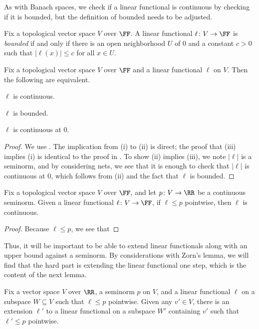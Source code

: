 \documentclass[notes.tex]{subfiles}
\begin{document}
As with Banach spaces, we check if a linear functional is continuous by checking if it is bounded, but the definition of bounded needs to be adjusted.
\begin{definition}[bounded]
	Fix a topological vector space $V$ over $\FF$. A linear functional $\ell\colon V\to\FF$ is \textit{bounded} if and only if there is an open neighborhood $U$ of $0$ and a constant $c>0$ such that $\left|\ell(x)\right|\le c$ for all $x\in U$.
\end{definition}
\begin{lemma}
	Fix a topological vector space $V$ over $\FF$ and a linear functional $\ell$ on $V$. Then the following are equivalent.
	\begin{listroman}
		\item $\ell$ is continuous.
		\item $\ell$ is bounded.
		\item $\ell$ is continuous at $0$.
	\end{listroman}
\end{lemma}
\begin{proof}
	We use . The implication from (i) to (ii) is direct; the proof that (iii) implies (i) is identical to the proof in . To show (ii) implies (iii), we note $\left|\ell\right|$ is a seminorm, and by considering nets, we see that it is enough to check that $\left|\ell\right|$ is continuous at $0$, which follows from (ii) and the fact that $\ell$ is bounded.
\end{proof}
\begin{corollary}
	Fix a topological vector space $V$ over $\FF$, and let $p\colon V\to\RR$ be a continuous seminorm. Given a linear functional $\ell\colon V\to\FF$, if $\ell\le p$ pointwise, then $\ell$ is continuous.
\end{corollary}
\begin{proof}
	Because $\ell\le p$, we see that 
\end{proof}
Thus, it will be important to be able to extend linear functionals along with an upper bound against a seminorm. By considerations with Zorn's lemma, we will find that the hard part is extending the linear functional one step, which is the content of the next lemma.
\begin{lemma} \label{lem:hahn-banach-one-step}
	Fix a vector space $V$ over $\RR$, a seminorm $p$ on $V$, and a linear functional $\ell$ on a subspace $W\subseteq V$ such that $\ell\le p$ pointwise. Given any $v'\in V$, there is an extension $\ell'$ to a linear functional on a subspace $W'$ containing $v'$ such that $\ell'\le p$ pointwise.
\end{lemma}
\end{document}

